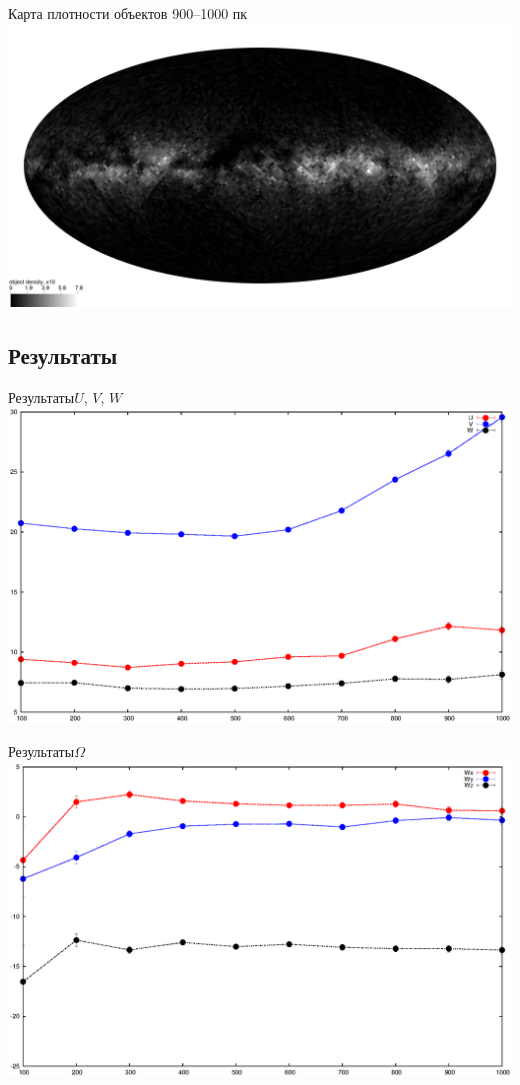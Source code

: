\documentclass{beamer}
\begin{document}
\begin{frame}{Карта плотности объектов 900--1000 пк}
\includegraphics[width=1\linewidth]{healpdens900.jpg}
\end{frame}
\subsection{Результаты}
\begin{frame}{Результаты}{$U$, $V$, $W$}
\includegraphics[width=1\linewidth]{./graphs/UVW100.eps}
\end{frame}

\begin{frame}{Результаты}{$\Omega$}
\includegraphics[width=1\linewidth]{./graphs/Omega100.eps}
\end{frame}
\end{document}
